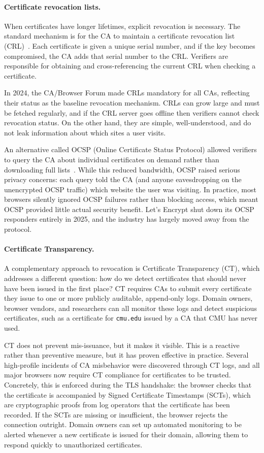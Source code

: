 \documentclass[11pt]{article}
\begin{document}
\paragraph{Certificate revocation lists.}
When certificates have longer lifetimes, explicit revocation is necessary.
The standard mechanism is for the CA to maintain a certificate revocation
list (CRL)~\citep{crl}. Each certificate is given a unique serial number,
and if the key becomes compromised, the CA adds that serial number to
the CRL. Verifiers are responsible for obtaining and cross-referencing
the current CRL when checking a certificate.

In 2024, the CA/Browser Forum made CRLs mandatory for all CAs, reflecting
their status as the baseline revocation mechanism. CRLs can grow large
and must be fetched regularly, and if the CRL server goes offline then
verifiers cannot check revocation status. On the other hand, they are
simple, well-understood, and do not leak information about which sites
a user visits.

An alternative called OCSP (Online Certificate Status Protocol) allowed
verifiers to query the CA about individual certificates on demand rather
than downloading full lists~\citep{ocsp}. While this reduced bandwidth,
OCSP raised serious privacy concerns: each query told the CA (and anyone
eavesdropping on the unencrypted OCSP traffic) which website the user was
visiting. In practice, most browsers silently ignored OCSP failures rather
than blocking access, which meant OCSP provided little actual security
benefit. Let's Encrypt shut down its OCSP responders entirely in 2025,
and the industry has largely moved away from the protocol.

\paragraph{Certificate Transparency.}
A complementary approach to revocation is Certificate Transparency (CT),
which addresses a different question: how do we detect certificates that
should never have been issued in the first place? CT requires CAs to
submit every certificate they issue to one or more publicly auditable,
append-only logs. Domain owners, browser vendors, and researchers can
all monitor these logs and detect suspicious certificates, such as a
certificate for \verb'cmu.edu' issued by a CA that CMU has never used.

CT does not prevent mis-issuance, but it makes it visible. This is a reactive
rather than preventive measure, but it has proven effective in practice.
Several high-profile incidents of CA misbehavior were discovered through
CT logs, and all major browsers now require CT compliance for certificates
to be trusted. Concretely, this is enforced during the TLS handshake: the
browser checks that the certificate is accompanied by Signed Certificate
Timestamps (SCTs), which are cryptographic proofs from log operators that
the certificate has been recorded. If the SCTs are missing or insufficient,
the browser rejects the connection outright.  Domain owners can set up
automated monitoring to be alerted whenever a new certificate is issued for
their domain, allowing them to respond quickly to unauthorized certificates.
\end{document}
